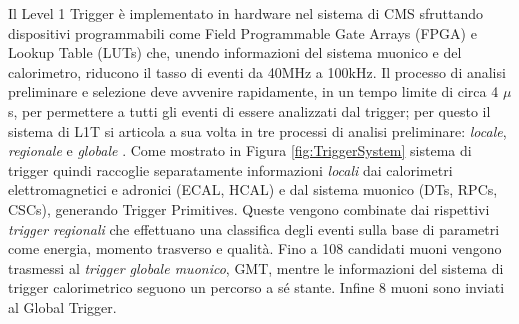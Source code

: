 Il Level 1 Trigger è implementato in hardware nel sistema di CMS sfruttando dispositivi programmabili come Field Programmable Gate Arrays (FPGA) e Lookup Table (LUTs) che, unendo informazioni del sistema muonico e del calorimetro, riducono il tasso di eventi da 40MHz a 100kHz. Il processo di analisi preliminare e selezione deve avvenire rapidamente, in un tempo limite di circa 4 $\mu$s, per permettere a tutti gli eventi di essere analizzati dal trigger; per questo il sistema di L1T si articola a sua volta in tre processi di analisi preliminare: \textit{locale}, \textit{regionale} e \textit{globale} \cite{MasterThesisNicLai}.\newline
Come mostrato in Figura \ref{fig:TriggerSystem} sistema di trigger quindi raccoglie separatamente informazioni \textit{locali} dai calorimetri elettromagnetici e adronici (ECAL, HCAL) e dal sistema muonico (DTs, RPCs, CSCs), generando Trigger Primitives. Queste vengono combinate dai rispettivi \textit{trigger regionali} che effettuano una classifica degli eventi sulla base di parametri come energia, momento trasverso e qualità. Fino a 108 candidati muoni vengono trasmessi al \textit{trigger globale muonico}, GMT, mentre le informazioni del sistema di trigger calorimetrico seguono un percorso a sé stante. Infine 8 muoni sono inviati al Global Trigger.

